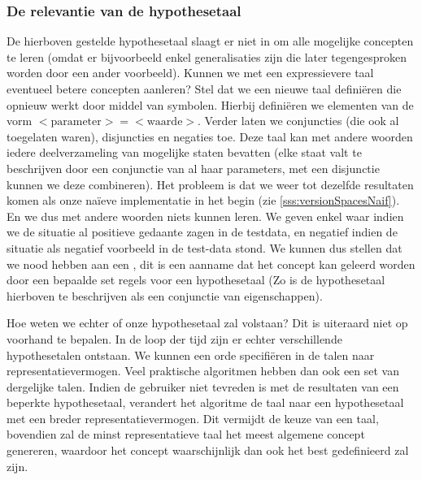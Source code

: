 \subsubsection{De relevantie van de hypothesetaal}
\label{sss:relevanceHypothesisLanguage}
De hierboven gestelde hypothesetaal slaagt er niet in om alle mogelijke concepten te leren (omdat er bijvoorbeeld enkel generalisaties zijn die later tegengesproken worden door een ander voorbeeld). Kunnen we met een expressievere taal eventueel betere concepten aanleren? Stel dat we een nieuwe taal definiëren die opnieuw werkt door middel van symbolen. Hierbij definiëren we elementen van de vorm $<\text{parameter}>=<\text{waarde}>$. Verder laten we conjuncties (die ook al toegelaten waren), disjuncties en negaties toe. Deze taal kan met andere woorden iedere deelverzameling van mogelijke staten bevatten (elke staat valt te beschrijven door een conjunctie van al haar parameters, met een disjunctie kunnen we deze combineren). Het probleem is dat we weer tot dezelfde resultaten komen als onze naïeve implementatie in het begin (zie \ref{sss:versionSpacesNaif}). En we dus met andere woorden niets kunnen leren. We geven enkel waar indien we de situatie al positieve gedaante zagen in de testdata, en negatief indien de situatie als negatief voorbeeld in de test-data stond. We kunnen dus stellen dat we nood hebben aan een , dit is een aanname dat het concept kan geleerd worden door een bepaalde set regels voor een hypothesetaal (Zo is de hypothesetaal hierboven te beschrijven als een conjunctie van eigenschappen).

Hoe weten we echter of onze hypothesetaal zal volstaan? Dit is uiteraard niet op voorhand te bepalen. In de loop der tijd zijn er echter verschillende hypothesetalen ontstaan. We kunnen een orde specifiëren in de talen naar representatievermogen. Veel praktische algoritmen hebben dan ook een set van dergelijke talen. Indien de gebruiker niet tevreden is met de resultaten van een beperkte hypothesetaal, verandert het algoritme de taal naar een hypothesetaal met een breder representatievermogen. Dit vermijdt de keuze van een taal, bovendien zal de minst representatieve taal het meest algemene concept genereren, waardoor het concept waarschijnlijk dan ook het best gedefinieerd zal zijn.
